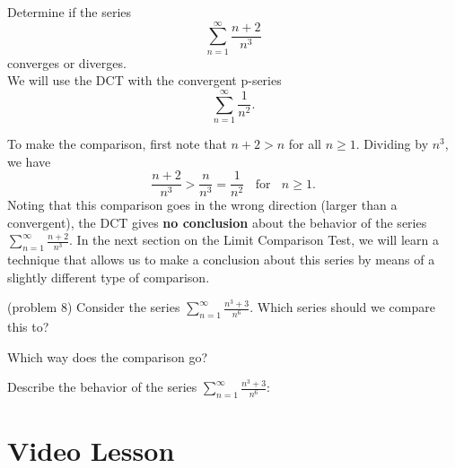 \documentclass{ximera}
\begin{document}
\begin{example}[example 8] %
Determine if the series 
\[
\sum_{n=1}^\infty \frac{n+2}{n^3}
\]
 converges or diverges.\\
We will use the DCT with the convergent p-series 
\[
\sum_{n=1}^\infty \frac{1}{n^2}.
\]

To make the comparison, first note that $ n+2 > n$ for all $n \geq 1$. Dividing by $n^3$,
we have 
\[
\frac{n+2}{n^3} > \frac{n}{n^3} = \frac{1}{n^2} \; \; \text{ for } \; \; n \geq 1.
\]
Noting that this comparison goes in the wrong direction (larger than a convergent), the DCT gives \textbf{no conclusion}
about the behavior of the series $\sum_{n=1}^\infty \frac{n+2}{n^3}$. In the next section on the Limit Comparison Test, 
we will learn a technique that allows us to make a conclusion about this series by means of a slightly different type of comparison.
\end{example}



\begin{problem}(problem 8)
Consider the series $\displaystyle{\sum_{n=1}^\infty \frac{n^3 +3}{n^6}}$.
Which series should we compare this to?

\begin{multipleChoice}
\end{multipleChoice}

Which way does the comparison go?
\begin{multipleChoice}
\end{multipleChoice}

Describe the behavior of the series $\sum_{n=1}^\infty \frac{n^3+3}{n^6}:$
\begin{multipleChoice}
\end{multipleChoice}

\end{problem}





\section{Video Lesson}
\end{document}
